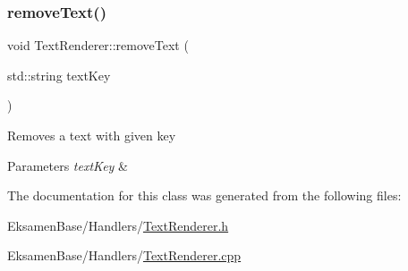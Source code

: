 \subsubsection{\texorpdfstring{remove\+Text()}{removeText()}}
{\footnotesize\ttfamily void Text\+Renderer\+::remove\+Text (\begin{DoxyParamCaption}\item[{std\+::string}]{text\+Key }\end{DoxyParamCaption})}



Removes a text with given key 


\begin{DoxyParams}{Parameters}
{\em text\+Key} & \\
\hline
\end{DoxyParams}


The documentation for this class was generated from the following files\+:\begin{DoxyCompactItemize}
\item 
Eksamen\+Base/\+Handlers/\mbox{\hyperlink{_text_renderer_8h}{Text\+Renderer.\+h}}\item 
Eksamen\+Base/\+Handlers/\mbox{\hyperlink{_text_renderer_8cpp}{Text\+Renderer.\+cpp}}\end{DoxyCompactItemize}
